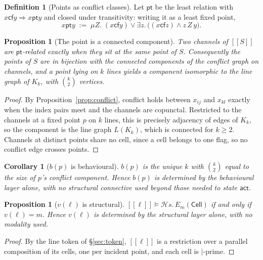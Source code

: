 \documentclass[11pt]{article}
\theoremstyle{plain}
\newtheorem{proposition}[theorem]{Proposition}
\newtheorem{corollary}[theorem]{Corollary}
\theoremstyle{definition}
\newtheorem{definition}[theorem]{Definition}
\newcommand{\enc}[1]{[\![#1]\!]}
\newcommand{\Cell}{\mathsf{Cell}}
\newcommand{\act}{\mathsf{act}}
\newcommand{\cf}{\mathsf{cf}}
\newcommand{\pt}{\mathsf{pt}}
\begin{document}
\begin{definition}[Points as conflict classes]
Let $\pt$ be the least relation with $x \cf y \Rightarrow x \mathrel{\pt} y$ and closed under
transitivity: writing it as a least fixed point,
\[
x \mathrel{\pt} y \;:=\; \mu Z.\; (x \cf y) \vee \exists z.\, \bigl( (x \cf z) \wedge z\, Z\, y \bigr).
\]
\end{definition}

\begin{proposition}[The point is a connected component]
\label{prop:pt}
Two channels of $\enc{S}$ are $\pt$-related exactly when they sit at the same point of $S$.
Consequently the points of $S$ are in bijection with the connected components of the conflict
graph on channels, and a point lying on $k$ lines yields a component isomorphic to the line graph
of $K_k$, with $\binom{k}{2}$ vertices.
\end{proposition}

\begin{proof}
By Proposition~\ref{prop:conflict}, conflict holds between $x_{ij}$ and $x_{kl}$ exactly when the
index pairs meet and the channels are copunctal. Restricted to the channels at a fixed point $p$
on $k$ lines, this is precisely adjacency of edges of $K_k$, so the component is the line graph
$L(K_k)$, which is connected for $k \geq 2$. Channels at distinct points share no cell, since a
cell belongs to one flag, so no conflict edge crosses points.
\end{proof}

\begin{corollary}[$b(p)$ is behavioural]
\label{cor:bp}
$b(p)$ is the unique $k$ with $\binom{k}{2}$ equal to the size of $p$'s conflict component. Hence
$b(p)$ is determined by the behavioural layer alone, with no structural connective used beyond
those needed to state $\act$.
\end{corollary}

\begin{proposition}[$v(\ell)$ is structural]
\label{prop:vl}
$\enc{\ell} \models \mathcal{H}s.\,E_m(\Cell)$ if and only if $v(\ell)=m$. Hence $v(\ell)$ is
determined by the structural layer alone, with no modality used.
\end{proposition}

\begin{proof}
By the line token of \S\ref{sec:token}, $\enc{\ell}$ is a restriction over a parallel composition
of its cells, one per incident point, and each cell is $|$-prime.
\end{proof}
\end{document}
